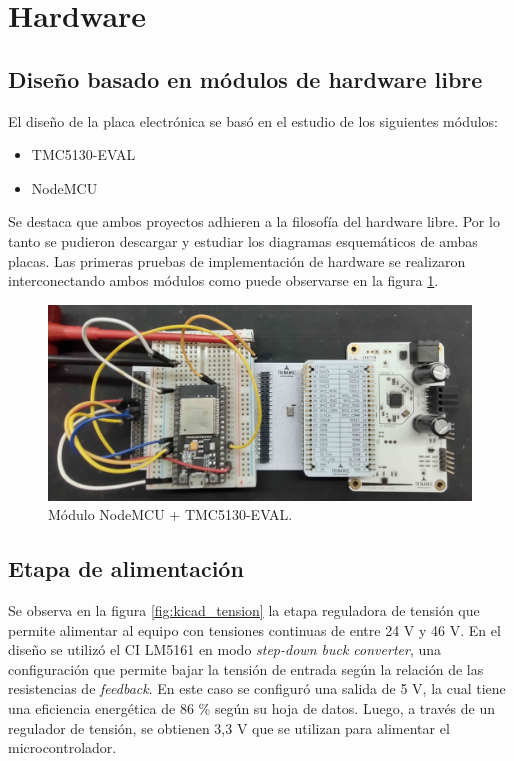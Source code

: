 \section{Hardware}
\label{section:Hardware}
\subsection{Diseño basado en módulos de hardware libre}
\label{subsection:Diseño basado en módulos de hardware libre}

El diseño de la placa electrónica se basó en el estudio de los siguientes módulos:
\begin{itemize}
\item TMC5130-EVAL \citep{3_web_trinamic_placa}	
\item NodeMCU \citep{web_nodemcu}
\end{itemize}
Se destaca que ambos proyectos adhieren a la filosofía del hardware libre. Por lo tanto se pudieron descargar y estudiar los diagramas esquemáticos de ambas placas. Las primeras pruebas de implementación de hardware se realizaron interconectando ambos módulos como puede observarse en la figura \ref{fig:esp_tmc5130}.

\begin{figure}[!h]
	\centering
	\includegraphics[width=1\textwidth]{./Figures/esp_tmc5130_v2.jpg}
	\caption{Módulo NodeMCU + TMC5130-EVAL.}
	\label{fig:esp_tmc5130}
\end{figure}

\subsection{Etapa de alimentación}

Se observa en la figura \ref{fig:kicad_tension} la etapa reguladora de tensión que permite alimentar al equipo con tensiones continuas de entre 24 V y 46 V. En el diseño se utilizó el CI LM5161 en modo \textit{step-down buck converter}, una configuración que permite bajar la tensión de entrada según la relación de las resistencias de \textit{feedback}. En este caso se configuró una salida de 5 V, la cual tiene una eficiencia energética de 86 \% según su hoja de datos. Luego, a través de un regulador de tensión, se obtienen 3,3 V que se utilizan para alimentar el microcontrolador.

